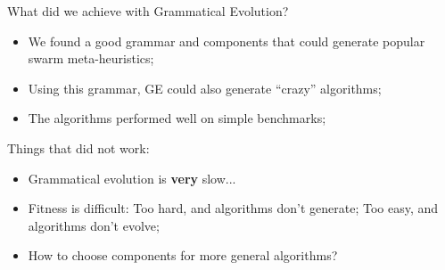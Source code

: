 \documentclass[aspectratio=169]{beamer}
\begin{document}
\begin{frame}{What did we achieve with Grammatical Evolution?}
  \begin{itemize}
  \item We found a good grammar and components that could generate popular swarm meta-heuristics;
  \item Using this grammar, GE could also generate ``crazy'' algorithms;
  \item The algorithms performed well on simple benchmarks;
  \end{itemize}
  \bigskip

  \alert{Things that did not work:}
  \begin{itemize}
  \item Grammatical evolution is {\bf very} slow...
  \item Fitness is difficult: Too hard, and algorithms don't generate; Too easy, and algorithms don't evolve;
  \item How to choose components for more general algorithms?
  \end{itemize}
\end{frame}

\end{document}
